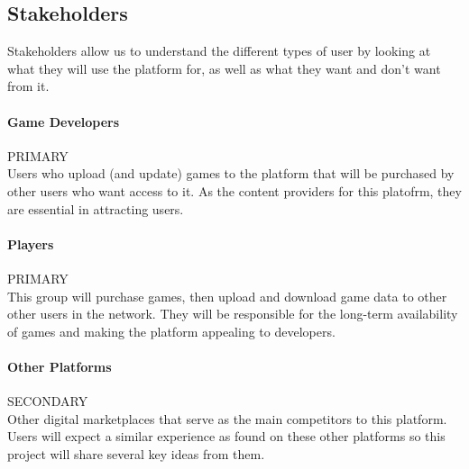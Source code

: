 
\subsection{Stakeholders}

Stakeholders allow us to understand the different types of user by looking at what they will use the platform for, as well as what they want and don't want from it.

\newcommand{\primary}{\hspace*{\fill}PRIMARY\\}
\newcommand{\secondary}{\hspace*{\fill}SECONDARY\\}
\newcommand{\tertiary}{\hspace*{\fill}TERTIARY\\}

\paragraph{Game Developers}\primary
Users who upload (and update) games to the platform that will be purchased by other users who want access to it. As the content providers for this platofrm, they are essential in attracting users.

\paragraph{Players}\primary
This group will purchase games, then upload and download game data to other other users in the network. They will be responsible for the long-term availability of games and making the platform appealing to developers.

\paragraph{Other Platforms}\secondary
Other digital marketplaces that serve as the main competitors to this platform. Users will expect a similar experience as found on these other platforms so this project will share several key ideas from them.